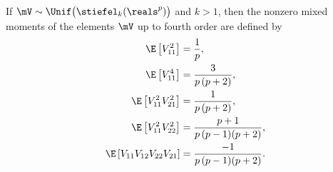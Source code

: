 \begin{lemma}\label{L:stiefel-k-moments}
    If $\mV \sim \Unif\big( \stiefel_k(\reals^p) \big)$ and $k > 1$, then the
    nonzero mixed moments of the elements $\mV$ up to fourth order
    are defined by
    \begin{subequations}
    \begin{align*}
        \E \left[ V_{11}^2 \right] 
            &= 
                \frac{1}{ p }, \\
        \E \left[ V_{11}^4 \right] 
            &=
                \frac{3}{ p \, (p+2) }, \\
        \E \left[ V_{11}^2 V_{21}^2 \right] 
            &= 
                \frac{1}{ p \, (p+2) }, \\
        \E \left[ V_{11}^2 V_{22}^2 \right]
            &= 
                \frac{p+1}{ p \, (p-1) (p+2) }, \\
        \E \left[ V_{11} V_{12} V_{22} V_{21} \right] 
            &= 
                \frac{ -1 }{ p \, (p-1) (p+2) }.
    \end{align*}
    \end{subequations}
\end{lemma}
